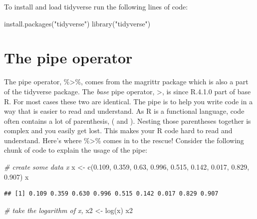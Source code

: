 \documentclass[
  12pt,
  oneside]{book}
\newenvironment{Shaded}{\begin{snugshade}}{\end{snugshade}}
\newcommand{\CommentTok}[1]{\textcolor[rgb]{0.56,0.35,0.01}{\textit{#1}}}
\newcommand{\FloatTok}[1]{\textcolor[rgb]{0.00,0.00,0.81}{#1}}
\newcommand{\FunctionTok}[1]{\textcolor[rgb]{0.00,0.00,0.00}{#1}}
\newcommand{\NormalTok}[1]{#1}
\newcommand{\OtherTok}[1]{\textcolor[rgb]{0.56,0.35,0.01}{#1}}
\newcommand{\StringTok}[1]{\textcolor[rgb]{0.31,0.60,0.02}{#1}}
\theoremstyle{definition}
\theoremstyle{definition}
\theoremstyle{definition}
\theoremstyle{definition}
\theoremstyle{remark}
\begin{document}
To install and load tidyverse run the following lines of code:

\begin{Shaded}
\begin{Highlighting}[]
\FunctionTok{install.packages}\NormalTok{(}\StringTok{"tidyverse"}\NormalTok{)}
\FunctionTok{library}\NormalTok{(}\StringTok{"tidyverse"}\NormalTok{)}
\end{Highlighting}
\end{Shaded}

\hypertarget{the-pipe-operator}{%
\section{The pipe operator}\label{the-pipe-operator}}

The pipe operator, \%\textgreater\%, comes from the magrittr package which is also a part of the tidyverse package. The \emph{base} pipe operator, \textbar\textgreater, is since R.4.1.0 part of base R. For most cases these two are identical. The pipe is to help you write code in a way that is easier to read and understand.
As R is a functional language, code often contains a lot of parenthesis, ( and ). Nesting those parentheses together is complex and you easily get lost. This makes your R code hard to read and understand. Here's where \%\textgreater\% comes in to the rescue! Consider the following chunk of code to explain the usage of the pipe:

\begin{Shaded}
\begin{Highlighting}[]
\CommentTok{\# create some data \textasciigrave{}x\textasciigrave{}}
\NormalTok{x }\OtherTok{\textless{}{-}} \FunctionTok{c}\NormalTok{(}\FloatTok{0.109}\NormalTok{, }\FloatTok{0.359}\NormalTok{, }\FloatTok{0.63}\NormalTok{, }\FloatTok{0.996}\NormalTok{, }\FloatTok{0.515}\NormalTok{, }\FloatTok{0.142}\NormalTok{, }\FloatTok{0.017}\NormalTok{, }\FloatTok{0.829}\NormalTok{, }\FloatTok{0.907}\NormalTok{)}
\NormalTok{x}
\end{Highlighting}
\end{Shaded}

\begin{verbatim}
## [1] 0.109 0.359 0.630 0.996 0.515 0.142 0.017 0.829 0.907
\end{verbatim}

\begin{Shaded}
\begin{Highlighting}[]
\CommentTok{\# take the logarithm of \textasciigrave{}x\textasciigrave{}, }
\NormalTok{x2 }\OtherTok{\textless{}{-}} \FunctionTok{log}\NormalTok{(x)}
\NormalTok{x2}
\end{Highlighting}
\end{Shaded}
\end{document}
